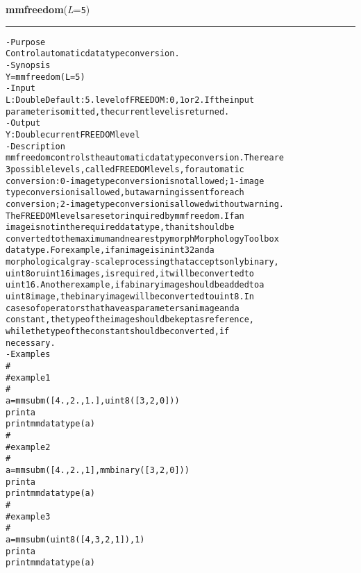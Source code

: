     \begin{boxedminipage}{\textwidth}

    \raggedright \textbf{mmfreedom}(\textit{L}=\texttt{5\-})

    \vspace{-1.5ex}

    \rule{\textwidth}{0.5\fboxrule}
\begin{alltt}
- Purpose
    Control automatic data type conversion.
- Synopsis
    Y = mmfreedom(L=5)
- Input
    L: Double Default: 5. level of FREEDOM: 0, 1 or 2. If the input
       parameter is omitted, the current level is returned.
- Output
    Y: Double current FREEDOM level
- Description
    mmfreedom controls the automatic data type conversion. There are
    3 possible levels, called FREEDOM levels, for automatic
    conversion: 0 - image type conversion is not allowed; 1- image
    type conversion is allowed, but a warning is sent for each
    conversion; 2- image type conversion is allowed without warning.
    The FREEDOM levels are set or inquired by mmfreedom . If an
    image is not in the required datatype, than it should be
    converted to the maximum and nearest pymorph Morphology Toolbox
    datatype. For example, if an image is in int32 and a
    morphological gray-scale processing that accepts only binary,
    uint8 or uint16 images, is required, it will be converted to
    uint16. Another example, if a binary image should be added to a
    uint8 image, the binary image will be converted to uint8. In
    cases of operators that have as parameters an image and a
    constant, the type of the image should be kept as reference,
    while the type of the constant should be converted, if
    necessary.
- Examples
    \#
    \#   example 1
    \#
    a=mmsubm([4., 2., 1.],uint8([3, 2, 0]))
    print a
    print mmdatatype(a)
    \#
    \#   example 2
    \#
    a=mmsubm([4., 2., 1], mmbinary([3, 2, 0]))
    print a
    print mmdatatype(a)
    \#
    \#   example 3
    \#
    a=mmsubm(uint8([4, 3, 2, 1]), 1)
    print a
    print mmdatatype(a)\end{alltt}

    \vspace{1ex}

    \end{boxedminipage}

    \label{multireg:num_pymorph:mmgdist}
    \vspace{0.5ex}


